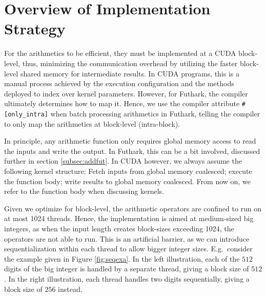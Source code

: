 \section{Overview of Implementation Strategy}
\label{sec:strat}

For the arithmetics to be efficient, they must be implemented at a CUDA
block-level, thus, minimizing the communication overhead by utilizing the faster
block-level shared memory for intermediate results. In CUDA programs, this is a
manual process achieved by the execution configuration and the methods deployed
to index over kernel parameters. However, for Futhark, the compiler ultimately
determines how to map it. Hence, we use the compiler attribute
\texttt{\#[only\_intra]} when batch processing arithmetics in Futhark, telling
the compiler to only map the arithmetics at block-level (intra-block).

In principle, any arithmetic function only requires global memory access to read
the inputs and write the output. In Futhark, this can be a bit involved,
discussed further in section \ref{subsec:addfut}. In CUDA however, we always
assume the following kernel structure: Fetch inputs from global memory
coalesced; execute the function body; write results to global memory
coalesced. From now on, we refer to the function body when discussing kernels.

Given we optimize for block-level, the arithmetic operators are confined to run
on at most 1024 threads. Hence, the implementation is aimed at medium-sized big
integers, as when the input length creates block-sizes exceeding 1024, the
operators are not able to run. This is an artificial barrier, as we can
introduce sequentialization within each thread to allow bigger integer
sizes. E.g.\ consider the example given in Figure \ref{fig:seqexa}. In the left
illustration, each of the $512$ digits of the big integer is handled by a
separate thread, giving a block size of $512$. In the right illustration, each
thread handles two digits sequentially, giving a block size of $256$ instead.

